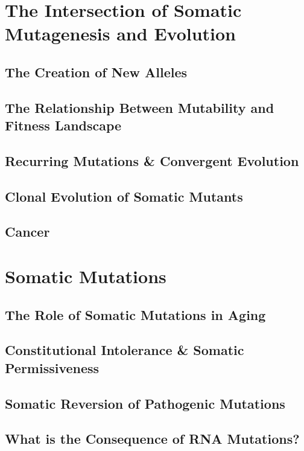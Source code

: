 \section{The Intersection of Somatic Mutagenesis and Evolution}
\subsection{The Creation of New Alleles}
\subsection{The Relationship Between Mutability and Fitness Landscape}
\subsection{Recurring Mutations \& Convergent Evolution}
\subsection{Clonal Evolution of Somatic Mutants}
\subsection{Cancer}










\section{Somatic Mutations}
\subsection{The Role of Somatic Mutations in Aging}
\subsection{Constitutional Intolerance \& Somatic Permissiveness}
\subsection{Somatic Reversion of Pathogenic Mutations}
\subsection{What is the Consequence of RNA Mutations?} 










